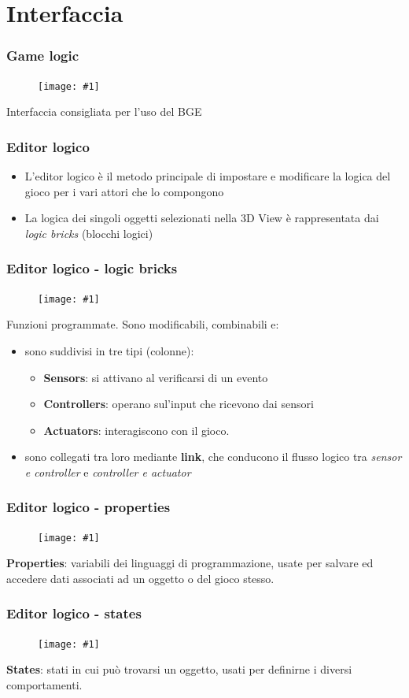 \documentclass{beamer}
\def\image[#1][#2]{
	\begin{figure}[H]
		\centering
		\texttt{[image: \#1]}
\end{figure}}
\begin{document}
	\section{Interfaccia}
		\begin{frame}
			\frametitle{Game logic}
			\image[images/gamegui.png][scale=0.16]
			Interfaccia consigliata per l'uso del BGE
		\end{frame}
		\begin{frame}
			\frametitle{Editor logico}
			\begin{itemize}
				\item L'editor logico è il metodo principale di impostare e modificare la logica del gioco per i vari attori che lo compongono
				\item La logica dei singoli oggetti selezionati nella 3D View è rappresentata dai \textit{logic bricks} (blocchi logici)
			\end{itemize}
		\end{frame}
		\begin{frame}
			\frametitle{Editor logico - logic bricks}
			\image[images/logic_bricks.png][scale=0.20]
			Funzioni programmate. Sono modificabili, combinabili e:
				\begin{itemize}
					\item sono suddivisi in tre tipi (colonne): 
					\begin{itemize}
						\item \textbf{Sensors}: si attivano al verificarsi di un evento
						\item \textbf{Controllers}: operano sul'input che ricevono dai sensori
						\item \textbf{Actuators}: interagiscono con il gioco.
					\end{itemize}
						\item sono collegati tra loro mediante \textbf{link}, che conducono il flusso logico tra \textit{sensor e controller} e \textit{controller e actuator}
					\end{itemize}
		\end{frame}
		\begin{frame}
			\frametitle{Editor logico - properties}
			\image[images/props.png][scale=0.4]
			\textbf{Properties}: variabili dei linguaggi di programmazione, usate per salvare ed accedere dati associati ad un oggetto o del gioco stesso.
		\end{frame}
		\begin{frame}
			\frametitle{Editor logico - states}
			\image[images/states.png][scale=0.3]
			\textbf{States}: stati in cui può trovarsi un oggetto, usati per definirne i diversi comportamenti. %
		\end{frame}
\end{document}
